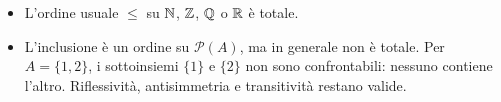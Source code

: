 \begin{esempio}
\leavevmode
\begin{itemize}
  \item L'ordine usuale $\le$ su $\mathbb{N}$, $\mathbb{Z}$, $\mathbb{Q}$ o $\mathbb{R}$ è totale.
  \item L'inclusione è un ordine su $\mathcal P(A)$, ma in generale non è totale. Per $A=\{1,2\}$, i sottoinsiemi $\{1\}$ e $\{2\}$ non sono confrontabili: nessuno contiene l'altro. Riflessività, antisimmetria e transitività restano valide.
\end{itemize}
\end{esempio}
